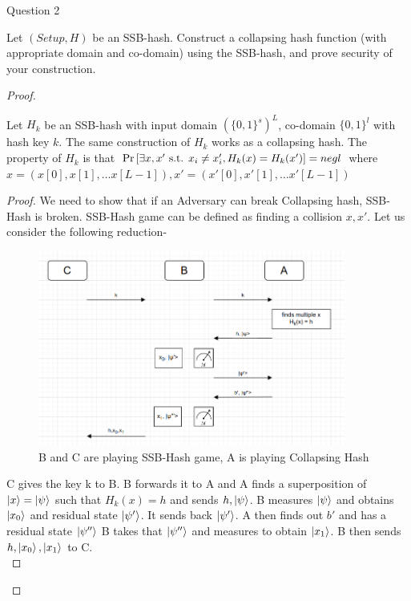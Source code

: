 \begin{solution}{Question 2}\label{ques:2}
    \begin{question}
    Let $(Setup, H)$ be an SSB-hash. Construct a collapsing hash function (with appropriate domain and co-domain) using the SSB-hash, and prove security of your construction.
    \end{question}
    \tcblower{}
    \begin{proof}
    \begin{claim}
        Let $H_k$ be an SSB-hash with input domain $(\{0,1\}^s)^L$, co-domain $\{0,1\}^l$ with hash key $k$. The same construction of $H_k$ works as a collapsing hash. The property of $H_k$ is that $\Pr\left[ \exists x,x' \text{ s.t. } x_i \neq x'_i, H_k(x) = H_k(x') \right] = negl$ where $x = (x[0], x[1], \ldots x[L-1]), x' = (x'[0], x'[1], \ldots x'[L-1])$
    \end{claim}
    \begin{proof}
        We need to show that if an Adversary can break Collapsing hash, SSB-Hash is broken. SSB-Hash game can be defined as finding a collision $x,x'$. Let us consider the following reduction-
        \begin{figure}[H]
            \centering
            \includegraphics[width = 0.9\textwidth]{image.png}
            \caption{B and C are playing SSB-Hash game, A is playing Collapsing Hash}
            \label{fig:q2}
        \end{figure}
        C gives the key k to B. B forwards it to A and A finds a superposition of $\ket{x} = \ket{\psi}$ such that $H_k(x) = h$ and sends $h, \ket{\psi}$. B measures $\ket{\psi}$ and obtains $\ket{x_0}$ and residual state $\ket{\psi'}$. It sends back $\ket{\psi'}$. A then finds out $b'$ and has a residual state $\ket{\psi''}$ B takes that $\ket{\psi''}$ and measures to obtain $\ket{x_1}$. B then sends $h, \ket{x_0}, \ket{x_1}$ to C.\\

\end{proof}
\end{proof}
\end{solution}
